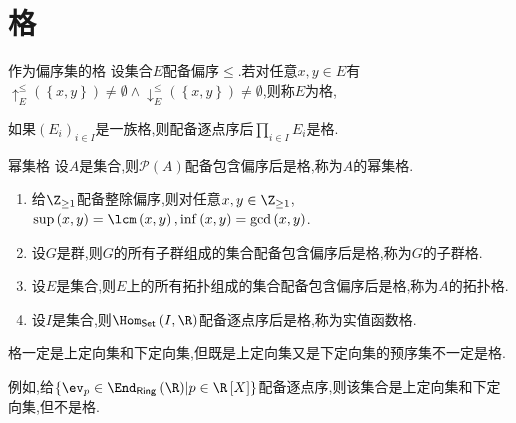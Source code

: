 \section{格}

\begin{definition}{作为偏序集的格}{}
	设集合$E$配备偏序$\leq$.若对任意$x,y\in E$有$\uparrow_{E}^{\leq}\left(\left\{x,y\right\}\right)\neq\emptyset\wedge\downarrow_{E}^{\leq}\left(\left\{x,y\right\}\right)\neq\emptyset$,则称$E$为格,
\end{definition}

\begin{proposition}{}{}
	如果$\left(E_{i}\right)_{i\in I}$是一族格,则配备逐点序后$\prod\limits_{i\in I}E_{i}$是格.
\end{proposition}

\begin{definition}{幂集格}{}
	设$A$是集合,则$\mathcal{P}\left(A\right)$配备包含偏序后是格,称为$A$的幂集格.
\end{definition}

\begin{example}{}{}
	\begin{enumerate}
		\item 给$\Z_{\geq 1}$配备整除偏序,则对任意$x,y\in\Z_{\geq 1}$,$\sup\left(x,y\right)=\lcm\left(x,y\right),\inf\left(x,y\right)=\gcd\left(x,y\right)$.
		\item 设$G$是群,则$G$的所有子群组成的集合配备包含偏序后是格,称为$G$的子群格.
		\item 设$E$是集合,则$E$上的所有拓扑组成的集合配备包含偏序后是格,称为$A$的拓扑格.
		\item 设$I$是集合,则$\Hom_{\mathsf{Set}}\left(I,\R\right)$配备逐点序后是格,称为实值函数格.
	\end{enumerate}
\end{example}

\begin{remark}{}{}
	格一定是上定向集和下定向集,但既是上定向集又是下定向集的预序集不一定是格.
	
	例如,给$\left\{\ev_{p}\in\End_{\mathsf{Ring}}\left(\R\right)\middle|p\in\R\left[X\right]\right\}$配备逐点序,则该集合是上定向集和下定向集,但不是格.
\end{remark}










































